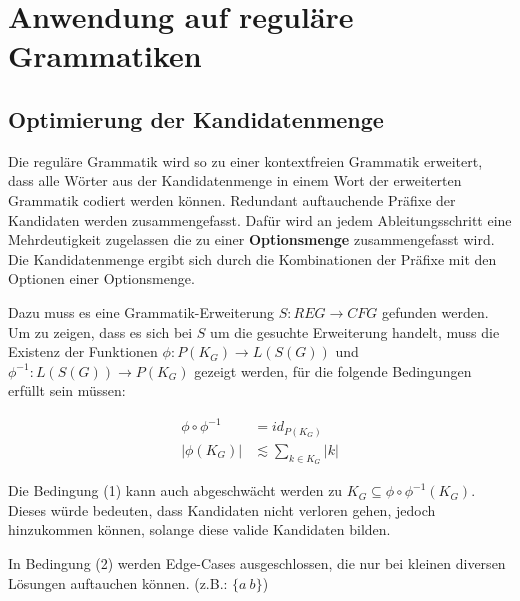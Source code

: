 \documentclass[]{article}
\begin{document}
% 





\section{Anwendung auf reguläre Grammatiken}

\subsection{Optimierung der Kandidatenmenge}
Die reguläre Grammatik wird so zu einer kontextfreien Grammatik erweitert, dass alle Wörter aus der Kandidatenmenge in einem Wort der erweiterten Grammatik codiert werden können. Redundant auftauchende Präfixe der Kandidaten werden zusammengefasst. Dafür wird an jedem Ableitungsschritt eine Mehrdeutigkeit zugelassen die zu einer \textbf{Optionsmenge} zusammengefasst wird. Die Kandidatenmenge ergibt sich durch die Kombinationen der Präfixe mit den Optionen einer Optionsmenge.

Dazu muss es eine Grammatik-Erweiterung $S: REG\rightarrow CFG$ gefunden werden.
Um zu zeigen, dass es sich bei $S$ um die gesuchte Erweiterung handelt, muss die Existenz der Funktionen $\phi: P(K_G) \rightarrow L(S(G))$ und $\phi^{-1}: L(S(G)) \rightarrow P(K_G)$ gezeigt werden, für die folgende Bedingungen erfüllt sein müssen:

\begin{align}
  \phi\circ\phi^{-1} &= id_{P(K_G)} \\
  |\phi(K_G)| &\lesssim \sum_{k\in K_G} |k|
\end{align}


Die Bedingung (1) kann auch abgeschwächt werden zu $K_G\subseteq \phi\circ\phi^{-1}(K_G)$. Dieses würde bedeuten, dass Kandidaten nicht verloren gehen, jedoch hinzukommen können, solange diese valide Kandidaten bilden.

In Bedingung (2) werden Edge-Cases ausgeschlossen, die nur bei kleinen diversen Lösungen auftauchen können. (z.B.: $\{a\ b\}$)
\end{document}
